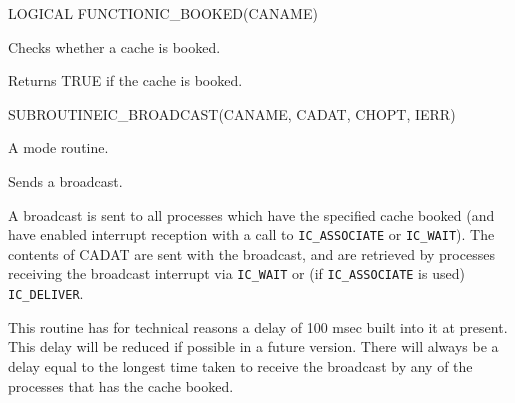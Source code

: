 \begin{routine} %
\subroutine
   {LOGICAL FUNCTION}{IC\_BOOKED}{(CANAME)}
\begin{overview}
Checks whether a cache is booked.

\end{overview}
\begin{argdeflist}
\end{argdeflist}
\begin{describe}

Returns TRUE if the cache is booked.

\end{describe}
\begin{options}
\end{options}
\end{routine}

\begin{routine} %
\subroutine
   {SUBROUTINE}{IC\_BROADCAST}{(CANAME, CADAT, CHOPT, IERR)}
\begin{overview}
A  \broadcast mode routine.

Sends a broadcast.
\end{overview}
\begin{argdeflist}
\end{argdeflist}
\begin{describe}

A broadcast is sent to all processes which have the specified cache
booked (and have enabled interrupt reception with a call to
{\tt IC\_ASSOCIATE} or {\tt IC\_WAIT}). 
The contents of CADAT are sent with the broadcast, and are
retrieved by processes receiving the broadcast interrupt via
{\tt IC\_WAIT} or (if {\tt IC\_ASSOCIATE} is used) \verb|IC_DELIVER|.

This routine has for technical reasons a delay of 100 msec built into
it at present. This delay will be reduced if possible in a future
version. There will always be a delay equal to the longest time taken
to receive the broadcast by any of the processes that has the cache booked.

\end{describe}
\begin{options}
\end{options}
\begin{returncodes}
\end{returncodes}
\end{routine}

